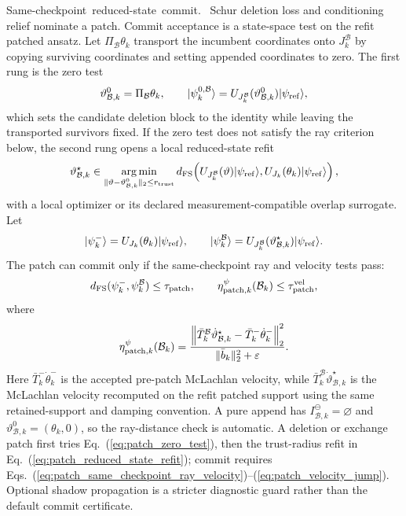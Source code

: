 \documentclass[
  reprint,
  amsmath,
  amssymb,
  aps,
  pra,
  nofootinbib,
  superscriptaddress,
  floatfix
]{revtex4-2}
\newcommand{\tentative}[1]{\textcolor{red!70!black}{#1}}
\newcommand{\structlabel}[1]{\noindent\mbox{\tentative{#1.}}~}
\newcommand{\eps}{\varepsilon}
\newcommand{\ket}[1]{|#1\rangle}
\begin{document}
\structlabel{Same-checkpoint reduced-state commit}
Schur deletion loss and conditioning relief nominate a patch.  Commit acceptance is a state-space test on the refit patched ansatz.  Let \(\Pi_{\mathcal B}\theta_k\) transport the incumbent coordinates onto \(J_k^{\mathcal B}\) by copying surviving coordinates and setting appended coordinates to zero.  The first rung is the zero test
\begin{equation}
\vartheta_{\mathcal B,k}^{0}
=
\Pi_{\mathcal B}\theta_k,
\qquad
\ket{\psi_k^{0,\mathcal B}}
=
U_{J_k^{\mathcal B}}(\vartheta_{\mathcal B,k}^{0})\ket{\psi_{\rm ref}},
\label{eq:patch_zero_test}
\end{equation}
which sets the candidate deletion block to the identity while leaving the transported survivors fixed.  If the zero test does not satisfy the ray criterion below, the second rung opens a local reduced-state refit
\begin{equation}
\vartheta_{\mathcal B,k}^{\star}
\in
\operatorname*{arg\,min}_{\|\vartheta-\vartheta_{\mathcal B,k}^{0}\|_2\le r_{\rm trust}}
d_{\rm FS}\!\left(
U_{J_k^{\mathcal B}}(\vartheta)\ket{\psi_{\rm ref}},
U_{J_k}(\theta_k)\ket{\psi_{\rm ref}}
\right),
\label{eq:patch_reduced_state_refit}
\end{equation}
with a local optimizer or its declared measurement-compatible overlap surrogate.  Let
\begin{equation*}
\ket{\psi_k^-}=U_{J_k}(\theta_k)\ket{\psi_{\rm ref}},
\qquad
\ket{\psi_k^{\mathcal B}}
=U_{J_k^{\mathcal B}}(\vartheta_{\mathcal B,k}^{\star})\ket{\psi_{\rm ref}} .
\end{equation*}
The patch can commit only if the same-checkpoint ray and velocity tests pass:
\begin{equation}
d_{\rm FS}(\psi_k^-,\psi_k^{\mathcal B})
\le \tau_{\rm patch},
\qquad
\eta_{{\rm patch},k}^{\psi}(\mathcal B_k)
\le \tau_{\rm patch}^{\rm vel},
\label{eq:patch_same_checkpoint_ray_velocity}
\end{equation}
where
\begin{equation}
\eta_{{\rm patch},k}^{\psi}(\mathcal B_k)
=
\frac{
\left\|
\bar T_k^{\mathcal B}\dot\vartheta_{\mathcal B,k}^{\star}
-
\bar T_k^{-}\dot\theta_k^{-}
\right\|_2^2
}{
\|\bar b_k\|_2^2+\eps
}.
\label{eq:patch_velocity_jump}
\end{equation}
Here \(\bar T_k^{-}\dot\theta_k^{-}\) is the accepted pre-patch McLachlan velocity, while \(\bar T_k^{\mathcal B}\dot\vartheta_{\mathcal B,k}^{\star}\) is the McLachlan velocity recomputed on the refit patched support using the same retained-support and damping convention.  A pure append has \(I_{\mathcal B,k}^{\ominus}=\varnothing\) and \(\vartheta_{\mathcal B,k}^{0}=(\theta_k,0)\), so the ray-distance check is automatic.  A deletion or exchange patch first tries Eq.~(\ref{eq:patch_zero_test}), then the trust-radius refit in Eq.~(\ref{eq:patch_reduced_state_refit}); commit requires Eqs.~(\ref{eq:patch_same_checkpoint_ray_velocity})--(\ref{eq:patch_velocity_jump}).  Optional shadow propagation is a stricter diagnostic guard rather than the default commit certificate.
\end{document}

